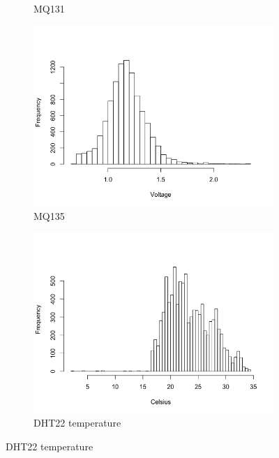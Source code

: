 \documentclass[11pt]{report}
\begin{document}
\begin{figure}[!tbp]
\begin{minipage}{1\linewidth}
\begin{subfigure}[t]{.5\linewidth}
            	\caption{MQ131}
            	\label{fig:ozone_histogram}
	   \end{subfigure}
        \end{minipage}
    \begin{minipage}{1\linewidth}
            \begin{subfigure}[t]{.5\linewidth}
                \includegraphics[width=\textwidth]{images/mq135_histogram}
                \caption{MQ135}
                \label{fig:mq135_histogram}
            \end{subfigure}
            \begin{subfigure}[t]{.5\linewidth}
            	\includegraphics[width=\textwidth]{images/temp_histogram}
            	\caption{DHT22 temperature}

\end{subfigure}
\end{minipage}
\end{figure}
\end{document}

